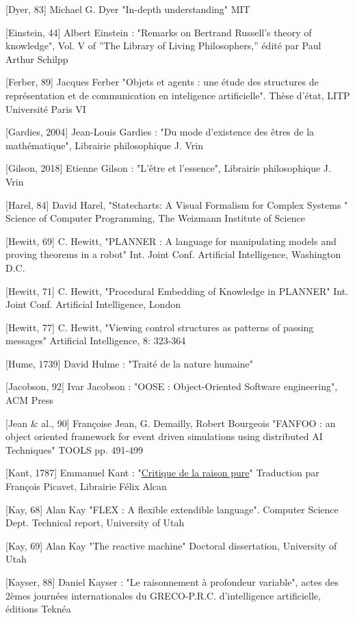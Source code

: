 \documentclass[a4paper, 12pt, openright, french]{book}
\begin{document}
{[}Dyer, 83{]} Michael G. Dyer "In-depth understanding" MIT

{[}Einstein, 44{]} Albert Einstein : "Remarks on Bertrand
Russell's theory of knowledge", Vol. V of ''The Library
of Living Philosophers,'' édité par Paul Arthur Schilpp

{[}Ferber, 89{]} Jacques Ferber "Objets et agents : une étude des
structures de représentation et de communication en inteligence
artificielle". Thèse d'état, LITP Université Paris VI

{[}Gardies, 2004{]} Jean-Louis Gardies : "Du mode
d'existence des êtres de la mathématique", Librairie
philosophique J. Vrin

{[}Gilson, 2018{]} Etienne Gilson : "L'être et
l'essence", Librairie philosophique J. Vrin

{[}Harel, 84{]} David Harel, "Statecharts: A Visual Formalism for
Complex Systems " Science of Computer Programming, The Weizmann
Institute of Science

{[}Hewitt, 69{]} C. Hewitt, "PLANNER : A language for manipulating
models and proving theorems in a robot" Int. Joint Conf. Artificial
Intelligence, Washington D.C.

{[}Hewitt, 71{]} C. Hewitt, "Procedural Embedding of Knowledge in
PLANNER" Int. Joint Conf. Artificial Intelligence, London

{[}Hewitt, 77{]} C. Hewitt, "Viewing control structures as patterns of
passing messages" Artificial Intelligence, 8: 323-364

{[}Hume, 1739{]} David Hulme : "Traité de la nature humaine"

{[}Jacobson, 92{]} Ivar Jacobson : "OOSE : Object-Oriented Software
engineering", ACM Press

{[}Jean \& al., 90{]} Françoise Jean, G. Demailly, Robert Bourgeois
"FANFOO : an object oriented framework for event driven simulations
using distributed AI Techniques" TOOLS pp. 491-499

{[}Kant, 1787{]} Emmanuel Kant :
"\href{https://fr.wikipedia.org/wiki/Critique_de_la_raison_pure}{Critique
de la raison pure}" Traduction par François Picavet, Librairie Félix
Alcan

{[}Kay, 68{]} Alan Kay "FLEX : A flexible extendible language". Computer
Science Dept. Technical report, University of Utah

{[}Kay, 69{]} Alan Kay "The reactive machine" Doctoral dissertation,
University of Utah

{[}Kayser, 88{]} Daniel Kayser : "Le raisonnement à profondeur
variable", actes des 2èmes journées internationales du GRECO-P.R.C.
d'intelligence artificielle, éditions Teknéa
\end{document}
